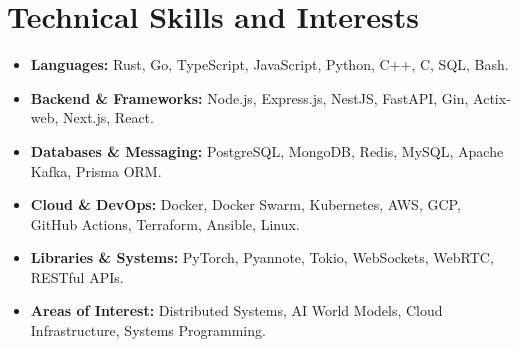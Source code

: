 \documentclass[letterpaper,10pt]{article}
\begin{document}
\section{Technical Skills and Interests}
\begin{itemize}[leftmargin=0.15in, itemsep=2pt, topsep=2pt, parsep=0pt, label={}]
  \item \textbf{Languages:} Rust, Go, TypeScript, JavaScript, Python, C++, C, SQL, Bash.
  \item \textbf{Backend \& Frameworks:} Node.js, Express.js, NestJS, FastAPI, Gin, Actix-web, Next.js, React.
  \item \textbf{Databases \& Messaging:} PostgreSQL, MongoDB, Redis, MySQL, Apache Kafka, Prisma ORM.
  \item \textbf{Cloud \& DevOps:} Docker, Docker Swarm, Kubernetes, AWS, GCP, GitHub Actions, Terraform, Ansible, Linux.
  \item \textbf{Libraries \& Systems:} PyTorch, Pyannote, Tokio, WebSockets, WebRTC, RESTful APIs.
  \item \textbf{Areas of Interest:} Distributed Systems, AI World Models, Cloud Infrastructure, Systems Programming.
\end{itemize}
\end{document}
